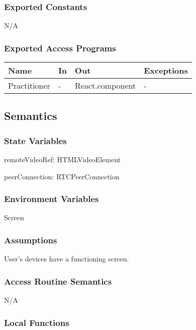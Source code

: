 \documentclass[12pt, titlepage]{article}
\begin{document}
\subsubsection{Exported Constants}

N/A

\subsubsection{Exported Access Programs}

\begin{center}
  \begin{tabular}{p{4cm} p{4cm} p{4cm} p{2cm}}
    \hline
    \textbf{Name}      & \textbf{In} & \textbf{Out}          & \textbf{Exceptions} \\
    \hline
    Practitioner & -     & React.component & -             \\
    \hline
  \end{tabular}
\end{center}

\subsection{Semantics}

\subsubsection{State Variables}

\noindent remoteVideoRef: HTMLVideoElement

\noindent peerConnection: RTCPeerConnection

\subsubsection{Environment Variables}

\noindent Screen

\subsubsection{Assumptions}

User's devices have a functioning screen.

\subsubsection{Access Routine Semantics}

N/A

\subsubsection{Local Functions}
\end{document}
